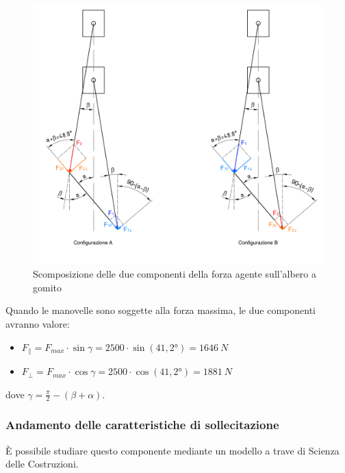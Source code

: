 \begin{figure}[h]
    \centering
    \includegraphics[scale=0.45]{Immagini/ScomposizioneForzeAlbero.png}
    \caption{Scomposizione delle due componenti della forza agente sull'albero a gomito}
    \label{fig:ScomposizioneForzeAlbero}
\end{figure}
Quando le manovelle sono soggette alla forza massima, le due componenti avranno valore:
\begin{itemize}
    \item $F_{\parallel}=F_{max}\cdot \sin \gamma=2500\cdot \sin (41,2°)= 1646\ N$
    \item $F_{\perp}=F_{max}\cdot\cos\gamma=2500\cdot \cos(41,2°)=1881\ N$
\end{itemize}
dove $\gamma=\frac{\pi}{2}-\left(\beta+\alpha\right)$.
\newpage
\subsubsection{Andamento delle caratteristiche di sollecitazione}
È possibile studiare questo componente mediante un modello a trave di Scienza delle Costruzioni. 
